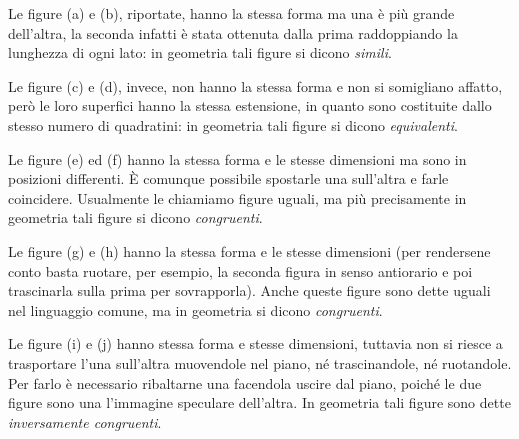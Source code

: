 \begin{minipage}{.49 \textwidth}
\begin{inaccessibleblock}
\centering

\end{inaccessibleblock}
\end{minipage}
\hfil
\begin{minipage}{.49 \textwidth}
Le figure (a) e (b), riportate, hanno la stessa forma ma una è 
più grande dell'altra, la seconda infatti è stata ottenuta dalla 
prima raddoppiando la lunghezza di ogni lato: in geometria tali 
figure si dicono \emph{simili}.

Le figure (c) e (d), invece, non hanno la stessa forma e non si 
somigliano affatto, però le loro superfici hanno la stessa 
estensione, in quanto sono costituite dallo stesso numero di 
quadratini: in geometria tali figure si dicono \emph{equivalenti}.
\end{minipage}


\begin{minipage}{.49 \textwidth}
Le figure (e) ed (f) hanno la stessa forma e le stesse dimensioni ma 
sono in posizioni differenti. \`E comunque possibile spostarle una 
sull'altra e farle coincidere. Usualmente le chiamiamo figure uguali, 
ma più precisamente in geometria tali figure si dicono 
\emph{congruenti}.

Le figure (g) e (h) hanno la stessa forma e le stesse dimensioni (per 
rendersene conto basta ruotare, per esempio, la seconda figura in 
senso antiorario e poi trascinarla sulla prima per sovrapporla). 
Anche queste figure sono dette uguali nel linguaggio comune, ma in 
geometria si dicono \emph{congruenti}.
\end{minipage}
\hfil
\begin{minipage}{.49 \textwidth}
\begin{inaccessibleblock}
\centering

\end{inaccessibleblock}
\end{minipage}

\begin{minipage}{.49 \textwidth}
\begin{inaccessibleblock}
\centering\label{fig:figure_i_j}
\end{inaccessibleblock}
\end{minipage}
\hfil
\begin{minipage}{.49 \textwidth}
Le figure (i) e (j) hanno stessa forma e stesse dimensioni, tuttavia 
non si riesce a trasportare l'una sull'altra muovendole nel piano, né 
trascinandole, né ruotandole. Per farlo è necessario ribaltarne una 
facendola uscire dal piano, poiché le due figure sono una l'immagine 
speculare dell'altra. In geometria tali figure sono dette 
\emph{inversamente congruenti}.
\end{minipage}

